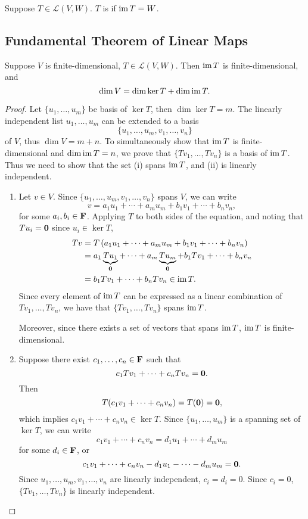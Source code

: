 \begin{definition}[Surjectivity]
Suppose $T\in\mathcal{L}(V,W)$. $T$ is  if $\operatorname{im} T=W$.
\end{definition}
\pagebreak

\subsection{Fundamental Theorem of Linear Maps}
\begin{theorem}
Suppose $V$ is finite-dimensional, $T\in\mathcal{L}(V,W)$. Then $\operatorname{im} T$ is finite-dimensional, and
\begin{equation}
\dim V=\dim\ker T+\dim\operatorname{im} T.
\end{equation}
\end{theorem}

\begin{proof}
Let $\{u_1,\dots,u_m\}$ be basis of $\ker T$, then $\dim\ker T=m$. The linearly independent list $u_1,\dots,u_m$ can be extended to a basis
\[\{u_1,\dots,u_m,v_1,\dots,v_n\}\]
of $V$, thus $\dim V=m+n$. To simultaneously show that $\operatorname{im} T$ is finite-dimensional and $\dim\operatorname{im} T=n$, we prove that $\{Tv_1,\dots,Tv_n\}$ is a basis of $\operatorname{im} T$. Thus we need to show that the set (i) spans $\operatorname{im} T$, and (ii) is linearly independent.

\begin{enumerate}[label=(\roman*)]
\item Let $v\in V$. Since $\{u_1,\dots,u_m,v_1,\dots,v_n\}$ spans $V$, we can write
\[v=a_1u_1+\cdots+a_mu_m+b_1v_1+\cdots+b_nv_n,\]
for some $a_i,b_i\in\mathbf F$. Applying $T$ to both sides of the equation, and noting that $Tu_i=\vb{0}$ since $u_i\in\ker T$,
\begin{align*}
Tv&=T\left(a_1u_1+\cdots+a_mu_m+b_1v_1+\cdots+b_nv_n\right)\\
&=a_1\underbrace{Tu_1}_{\vb{0}}+\cdots+a_m\underbrace{Tu_m}_{\vb{0}}+b_1Tv_1+\cdots+b_nv_n\\
&=b_1Tv_1+\cdots+b_nTv_n\in\operatorname{im} T.
\end{align*}
Since every element of $\operatorname{im} T$ can be expressed as a linear combination of $Tv_1,\dots,Tv_n$, we have that $\{Tv_1,\dots,Tv_n\}$ spans $\operatorname{im} T$.

Moreover, since there exists a set of vectors that spans $\operatorname{im} T$, $\operatorname{im} T$ is finite-dimensional.

\item Suppose there exist $c_1,\dots,c_n\in\mathbf F$ such that
\[c_1Tv_1+\cdots+c_nTv_n=\vb{0}.\]
Then
\[T(c_1v_1+\cdots+c_nv_n)=T(\vb{0})=\vb{0},\]
which implies $c_1v_1+\cdots+c_nv_n\in\ker T$. Since $\{u_1,\dots,u_m\}$ is a spanning set of $\ker T$, we can write
\[c_1v_1+\cdots+c_nv_n=d_1u_1+\cdots+d_mu_m\]
for some $d_i\in\mathbf F$, or
\[c_1v_1+\cdots+c_nv_n-d_1u_1-\cdots-d_mu_m=\vb{0}.\]
Since $u_1,\dots,u_m,v_1,\dots,v_n$ are linearly independent, $c_i=d_i=0$. Since $c_i=0$, $\{Tv_1,\dots,Tv_n\}$ is linearly independent.
\end{enumerate}
\end{proof}

